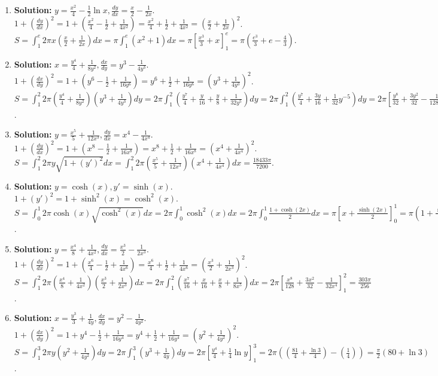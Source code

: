 \documentclass{article}
\begin{document}
\begin{enumerate}
\item \textbf{Solution:} $y=\frac{x^2}{4}-\frac{1}{2}\ln x, \frac{dy}{dx}=\frac{x}{2}-\frac{1}{2x}$. $1+(\frac{dy}{dx})^2 = 1+(\frac{x^2}{4}-\frac{1}{2}+\frac{1}{4x^2}) = \frac{x^2}{4}+\frac{1}{2}+\frac{1}{4x^2} = (\frac{x}{2}+\frac{1}{2x})^2$.
$S=\int_1^e 2\pi x (\frac{x}{2}+\frac{1}{2x}) dx = \pi \int_1^e (x^2+1)dx = \pi[\frac{x^3}{3}+x]_1^e = \pi(\frac{e^3}{3}+e - \frac{4}{3})$.

\item \textbf{Solution:} $x=\frac{y^4}{4}+\frac{1}{8y^2}, \frac{dx}{dy}=y^3-\frac{1}{4y^3}$. $1+(\frac{dx}{dy})^2=1+(y^6-\frac{1}{2}+\frac{1}{16y^6})=y^6+\frac{1}{2}+\frac{1}{16y^6}=(y^3+\frac{1}{4y^3})^2$.
$S=\int_1^2 2\pi(\frac{y^4}{4}+\frac{1}{8y^2})(y^3+\frac{1}{4y^3})dy = 2\pi \int_1^2 (\frac{y^7}{4}+\frac{y}{16}+\frac{y}{8}+\frac{1}{32y^5})dy = 2\pi \int_1^2 (\frac{y^7}{4}+\frac{3y}{16}+\frac{1}{32}y^{-5})dy = 2\pi[\frac{y^8}{32}+\frac{3y^2}{32}-\frac{1}{128y^4}]_1^2 = \frac{255\pi}{128}$.

\item \textbf{Solution:} $y=\frac{x^5}{5}+\frac{1}{12x^3}, \frac{dy}{dx}=x^4-\frac{1}{4x^4}$. $1+(\frac{dy}{dx})^2 = 1+(x^8-\frac{1}{2}+\frac{1}{16x^8}) = x^8+\frac{1}{2}+\frac{1}{16x^8}=(x^4+\frac{1}{4x^4})^2$.
$S = \int_1^2 2\pi y \sqrt{1+(y')^2} dx = \int_1^2 2\pi (\frac{x^5}{5}+\frac{1}{12x^3})(x^4+\frac{1}{4x^4}) dx = \frac{18433\pi}{7200}$.

\item \textbf{Solution:} $y=\cosh(x), y'=\sinh(x)$. $1+(y')^2=1+\sinh^2(x)=\cosh^2(x)$.
$S = \int_0^1 2\pi\cosh(x)\sqrt{\cosh^2(x)}dx = 2\pi\int_0^1 \cosh^2(x)dx = 2\pi\int_0^1 \frac{1+\cosh(2x)}{2}dx = \pi[x+\frac{\sinh(2x)}{2}]_0^1 = \pi(1+\frac{\sinh(2)}{2})$.

\item \textbf{Solution:} $y=\frac{x^4}{8}+\frac{1}{4x^2}, \frac{dy}{dx}=\frac{x^3}{2}-\frac{1}{2x^3}$. $1+(\frac{dy}{dx})^2=1+(\frac{x^6}{4}-\frac{1}{2}+\frac{1}{4x^6})=\frac{x^6}{4}+\frac{1}{2}+\frac{1}{4x^6}=(\frac{x^3}{2}+\frac{1}{2x^3})^2$.
$S=\int_1^2 2\pi(\frac{x^4}{8}+\frac{1}{4x^2})(\frac{x^3}{2}+\frac{1}{2x^3})dx=2\pi\int_1^2(\frac{x^7}{16}+\frac{x}{16}+\frac{x}{8}+\frac{1}{8x^5})dx = 2\pi[\frac{x^8}{128}+\frac{3x^2}{32}-\frac{1}{32x^4}]_1^2 = \frac{303\pi}{256}$.

\item \textbf{Solution:} $x=\frac{y^3}{3}+\frac{1}{4y}, \frac{dx}{dy}=y^2-\frac{1}{4y^2}$. $1+(\frac{dx}{dy})^2=1+y^4-\frac{1}{2}+\frac{1}{16y^4}=y^4+\frac{1}{2}+\frac{1}{16y^4}=(y^2+\frac{1}{4y^2})^2$.
$S=\int_1^3 2\pi y(y^2+\frac{1}{4y^2})dy = 2\pi\int_1^3(y^3+\frac{1}{4y})dy = 2\pi[\frac{y^4}{4}+\frac{1}{4}\ln y]_1^3 = 2\pi((\frac{81}{4}+\frac{\ln 3}{4})-(\frac{1}{4})) = \frac{\pi}{2}(80+\ln 3)$.


\end{enumerate}
\end{document}
